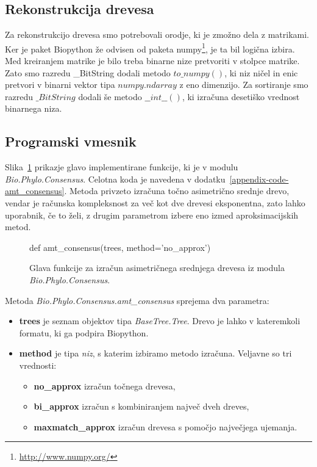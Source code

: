\documentclass[a4paper, 12pt]{book}
\begin{document}
\subsection{Rekonstrukcija drevesa}
Za rekonstrukcijo drevesa smo potrebovali orodje, ki je zmožno dela z matrikami. 
Ker je paket Biopython že odvisen od paketa numpy\footnote{\url{http://www.numpy.org/}},
je ta bil logična izbira. Med kreiranjem matrike je bilo treba binarne nize 
pretvoriti v stolpce matrike. Zato smo razredu \_BitString dodali metodo 
$to\_numpy()$, ki niz ničel in enic pretvori v binarni vektor tipa 
$numpy.ndarray$ z eno dimenzijo. Za sortiranje smo razredu 
$\_BitString$ dodali še metodo $\_\_int\_\_()$, ki izračuna desetiško vrednost 
binarnega niza.

\subsection{Programski vmesnik}

Slika~\ref{code-amt-func} prikazje glavo implementirane funkcije, ki je v 
modulu {\it Bio.Phylo.Consensus}. Celotna koda je navedena v dodatku~\ref{appendix-code-amt_consensus}.
Metoda privzeto izračuna točno asimetrično srednje
drevo, vendar je računska kompleksnost za več kot dve drevesi eksponentna, zato 
lahko uporabnik, če to želi, z drugim parametrom izbere eno izmed 
aproksimacijskih metod. 

\begin{figure}[h!]
	\begin{python}
		def amt_consensus(trees, method='no_approx')
	\end{python}
	\caption{Glava funkcije za izračun asimetričnega srednjega drevesa iz modula {\it Bio.Phylo.Consensus}.}
	\label{code-amt-func}
\end{figure}

\noindent Metoda {\it Bio.Phylo.Consensus.amt\_consensus}
sprejema dva parametra:

\begin{itemize}
\item {\bf trees} je seznam objektov tipa {\it BaseTree.Tree}. Drevo je lahko v kateremkoli formatu, ki ga podpira Biopython.

\item {\bf method} je tipa {\it niz}, s katerim izbiramo metodo izračuna. Veljavne so tri vrednosti:

\begin{itemize}
    \item {\bf no\_approx} izračun točnega drevesa,

    \item {\bf bi\_approx} izračun s kombiniranjem največ dveh dreves,

    \item {\bf maxmatch\_approx} izračun drevesa s pomočjo največjega ujemanja.
\end{itemize}
\end{itemize}
    
\end{document}
